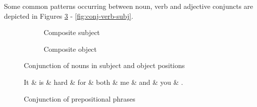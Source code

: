     Some common patterns occurring between noun, verb and adjective conjuncts are depicted in Figures \ref{fig:conj-noun} - \ref{fig:conj-verb-subj}.

    \begin{figure}[!ht]
    \centering
        \begin{subfigure}[b]{0.45\textwidth}
        \centering
            \caption{Composite subject}
            \label{fig:conj-noun-subj}
        \end{subfigure}%
        \quad
        \begin{subfigure}[b]{0.45\textwidth}
            \centering
            \caption{Composite object}
            \label{fig:conj-noun-obj}
        \end{subfigure}
        \caption{Conjunction of nouns in subject and object positions}
        \label{fig:conj-noun}
    \end{figure}


    \begin{figure}
    \centering
    \begin{dependency}
    		\begin{deptext}[]
    	It \& is \& hard \& for \& both \& me \& and \& you \& . \\ %
    		\end{deptext}
    	\end{dependency}
    \caption{Conjunction of prepositional phrases}
    \label{fig:conj-preps}
    \end{figure}

